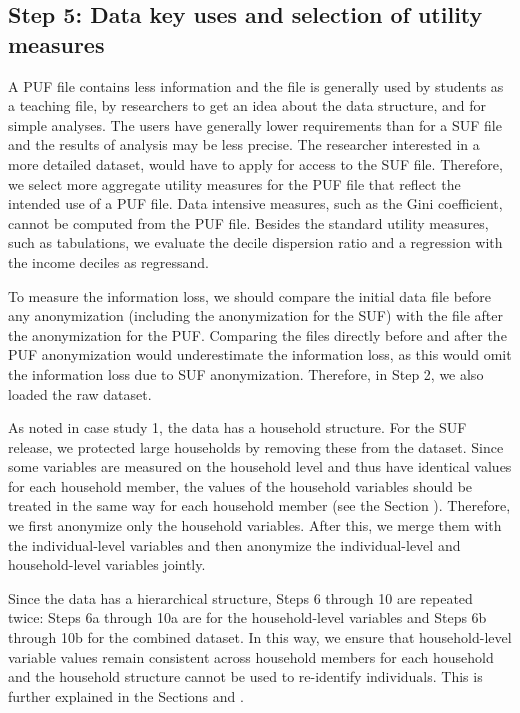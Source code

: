 \documentclass[letterpaper,10pt,english]{sphinxmanual}
\begin{document}
\subsection{Step 5: Data key uses and selection of utility measures}
\label{\detokenize{case_studies:id8}}
A PUF file contains less information and the file is generally used by
students as a teaching file, by researchers to get an idea about the
data structure, and for simple analyses. The users have generally lower
requirements than for a SUF file and the results of analysis may be less
precise. The researcher interested in a more detailed dataset, would
have to apply for access to the SUF file. Therefore, we select more
aggregate utility measures for the PUF file that reflect the intended
use of a PUF file. Data intensive measures, such as the Gini
coefficient, cannot be computed from the PUF file. Besides the standard
utility measures, such as tabulations, we evaluate the decile dispersion
ratio and a regression with the income deciles as regressand.

To measure the information loss, we should compare the initial data file
before any anonymization (including the anonymization for the SUF) with
the file after the anonymization for the PUF. Comparing the files
directly before and after the PUF anonymization would underestimate the
information loss, as this would omit the information loss due to SUF
anonymization. Therefore, in Step 2, we also loaded the raw dataset.


As noted in case study 1, the data has a household structure. For the
SUF release, we protected large households by removing these from the
dataset. Since some variables are measured on the household level and
thus have identical values for each household member, the values of the
household variables should be treated in the same way for each household
member (see the Section
). Therefore, we first anonymize only the
household variables. After this, we merge them with the individual-level
variables and then anonymize the individual-level and household-level
variables jointly.

Since the data has a hierarchical structure, Steps 6 through 10 are
repeated twice: Steps 6a through 10a are for the household-level
variables and Steps 6b through 10b for the combined dataset. In this
way, we ensure that household-level variable values remain consistent
across household members for each household and the household structure
cannot be used to re-identify individuals. This is further explained in
the Sections 
and .
\end{document}

